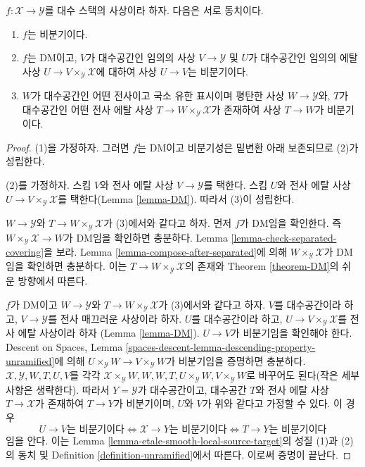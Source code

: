 \begin{lemma}
\label{lemma-unramified}
$f : \mathcal{X} \to \mathcal{Y}$를 대수 스택의 사상이라 하자. 다음은
서로 동치이다.
\begin{enumerate}
\item $f$는 비분기이다.
\item $f$는 DM이고, $V$가 대수공간인 임의의 사상
$V \to \mathcal{Y}$ 및 $U$가 대수공간인 임의의 에탈 사상
$U \to V \times_\mathcal{Y} \mathcal{X}$에 대하여 사상 $U \to V$는
비분기이다.
\item $W$가 대수공간인 어떤 전사이고 국소 유한 표시이며 평탄한 사상
$W \to \mathcal{Y}$와, $T$가 대수공간인 어떤 전사 에탈 사상
$T \to W \times_\mathcal{Y} \mathcal{X}$가 존재하여 사상 $T \to W$가
비분기이다.
\end{enumerate}
\end{lemma}

\begin{proof}
(1)을 가정하자. 그러면 $f$는 DM이고 비분기성은 밑변환 아래 보존되므로
(2)가 성립한다.

\medskip\noindent
(2)를 가정하자. 스킴 $V$와 전사 에탈 사상 $V \to \mathcal{Y}$를
택한다. 스킴 $U$와 전사 에탈 사상
$U \to V \times_\mathcal{Y} \mathcal{X}$를 택한다(Lemma
\ref{lemma-DM}). 따라서 (3)이 성립한다.

\medskip\noindent
$W \to \mathcal{Y}$와 $T \to W \times_\mathcal{Y} \mathcal{X}$가
(3)에서와 같다고 하자. 먼저 $f$가 DM임을 확인한다. 즉
$W \times_\mathcal{Y} \mathcal{X} \to W$가 DM임을 확인하면 충분하다.
Lemma \ref{lemma-check-separated-covering}을 보라. Lemma
\ref{lemma-compose-after-separated}에 의해
$W \times_\mathcal{Y} \mathcal{X}$가 DM임을 확인하면 충분하다. 이는
$T \to W \times_\mathcal{Y} \mathcal{X}$의 존재와 Theorem
\ref{theorem-DM}의 쉬운 방향에서 따른다.

\medskip\noindent
$f$가 DM이고 $W \to \mathcal{Y}$와
$T \to W \times_\mathcal{Y} \mathcal{X}$가 (3)에서와 같다고 하자.
$V$를 대수공간이라 하고, $V \to \mathcal{Y}$를 전사 매끄러운 사상이라
하자. $U$를 대수공간이라 하고,
$U \to V \times_\mathcal{Y} \mathcal{X}$를 전사 에탈 사상이라 하자
(Lemma \ref{lemma-DM}). $U \to V$가 비분기임을 확인해야 한다. Descent
on Spaces, Lemma \ref{spaces-descent-lemma-descending-property-unramified}에
의해 $U \times_\mathcal{Y} W \to V \times_\mathcal{Y} W$가 비분기임을
증명하면 충분하다. $\mathcal{X}, \mathcal{Y}, W, T, U, V$를 각각
$\mathcal{X} \times_\mathcal{Y} W, W, W, T, U \times_\mathcal{Y} W,
V \times_\mathcal{Y} W$로 바꾸어도 된다(작은 세부사항은 생략한다).
따라서 $Y = \mathcal{Y}$가 대수공간이고, 대수공간 $T$와 전사 에탈 사상
$T \to \mathcal{X}$가 존재하여 $T \to Y$가 비분기이며, $U$와 $V$가
위와 같다고 가정할 수 있다. 이 경우
$$
U \to V\text{는 비분기이다}
\Leftrightarrow
\mathcal{X} \to Y\text{는 비분기이다}
\Leftrightarrow
T \to Y\text{는 비분기이다}
$$
임을 안다. 이는 Lemma \ref{lemma-etale-smooth-local-source-target}의
성질 (1)과 (2)의 동치 및 Definition \ref{definition-unramified}에서
따른다. 이로써 증명이 끝난다.
\end{proof}

